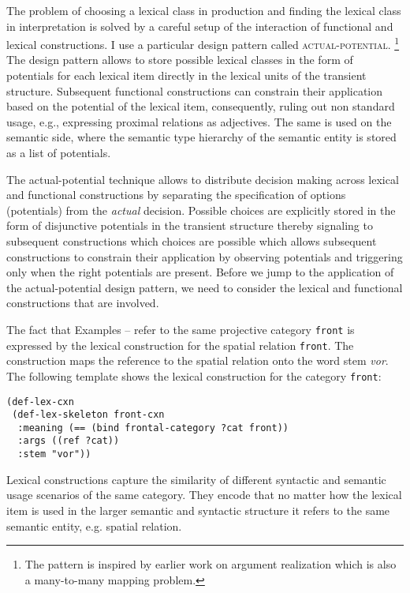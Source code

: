 The problem of choosing a lexical class in production and 
finding the lexical class in interpretation is solved by a careful
setup of the interaction of functional and lexical constructions.
I use a particular design pattern called \textsc{actual-potential}.%
\footnote{The pattern is inspired by earlier work on
argument realization \citep{vantrijp2008phd} which is 
also a many-to-many mapping problem.}
The design pattern allows to store possible lexical classes
in the form of potentials for each lexical item directly in the 
lexical units of the transient structure. Subsequent 
functional constructions can constrain their application based on the 
potential of the lexical item, consequently, ruling out 
non standard usage, e.g., expressing proximal relations as adjectives.
The same is used on the semantic side, where the semantic
type hierarchy of the semantic entity is stored as a list of potentials.

The actual-potential technique allows to 
distribute decision making across lexical and functional constructions 
by separating the specification of options (potentials)
from the \emph{actual} decision. Possible choices are
explicitly stored in the form of disjunctive potentials
in the transient structure 
thereby signaling to subsequent constructions which choices are 
possible which allows subsequent constructions to constrain their 
application by observing potentials and triggering only when
the right potentials are present. Before we jump to the 
application of the actual-potential design pattern, we need to 
consider the lexical and functional constructions that are involved.

The fact that Examples -- 
refer to the same projective category {\footnotesize\tt front} is expressed 
by the lexical construction for the spatial relation {\footnotesize\tt front}.
The construction maps the reference to the spatial relation onto 
the word stem \textit{vor}. The following template shows the lexical 
construction for the category {\footnotesize\tt front}:
\ea
\label{e:def-lex-front}
\begin{lstlisting}
(def-lex-cxn
 (def-lex-skeleton front-cxn 
  :meaning (== (bind frontal-category ?cat front)) 
  :args ((ref ?cat))
  :stem "vor"))
\end{lstlisting}
\z
Lexical constructions capture the similarity of different syntactic and
semantic usage scenarios of the same category. They encode
that no matter how the lexical item is used in the larger
semantic and syntactic structure it refers to the same
semantic entity, e.g. spatial relation.


